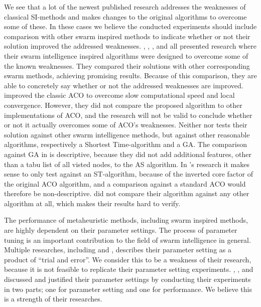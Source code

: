 We see that a lot of the newest published research addresses the weaknesses of classical SI-methods and makes changes to the original algorithms to overcome some of these. In these cases we believe the conducted experiments should include comparison with other swarm inspired methods to indicate whether or not their solution improved the addressed weaknesses. \citet{tripathi09}, \citet{yang07}, \citet{salehinejad10}, and \citet{jiang10} all presented research where their swarm intelligence inspired algorithms were designed to overcome some of the known weaknesses. They compared their solutions with other corresponding swarm methods, achieving promising results. Because of this comparison, they are able to concretely say whether or not the addressed weaknesses are improved. \citet{sedighpour14} improved the classic ACO to overcome slow computational speed and local convergence. However, they did not compare the proposed algorithm to other implementations of ACO, and the research will not be valid to conclude whether or not it actually overcomes some of ACO's weaknesses. 
Neither \citet{dias14} nor \citet{poorzahedy11} tests their solution against other swarm intelligence methods, but against other reasonable algorithms, respectively a Shortest Time-algorithm and a GA. The comparison against GA in \citet{poorzahedy11} is descriptive, because they did not add additional features, other than a tabu list of all visted nodes, to the AS algorithm. In \citet{dias14}'s research it makes sense to only test against an ST-algorithm, because of the inverted core factor of the original ACO algorithm, and a comparison against a standard ACO would therefore be non-descriptive. \citet{salehi-nezhad07} did not compare their algorithm against any other algorithm at all, which makes their results hard to verify. 

The performance of metaheuristic methods, including swarm inspired methods, are highly dependent on their parameter settings. The process of parameter tuning is an important contribution to the field of swarm intelligence in general. Multiple researches, including \citet{salehi-nezhad07} and \citet{yang07}, describes their parameter setting as a product of ``trial and error''. We consider this to be a weakness of their research, because it is not feasible to replicate their parameter setting experiments. \citet{sedighpour14}, \citet{poorzahedy11}, and \citet{kechagiopoulos14} discussed and justified their parameter settings by conducting their experiments in two parts; one for parameter setting and one for performance. We believe this is a strength of their researches. 

